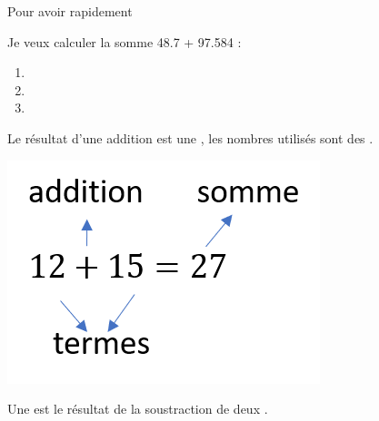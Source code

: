 {	\begin{mymeth}
		Pour avoir rapidement \hrulefill
		
		\vspace*{0.2cm}
		\hrulefill
		
		\vspace*{0.2cm}
		\hrulefill
	\end{mymeth}
	
	\begin{myex}
		Je veux calculer la somme \num{48.7} + \num{97.584} : 
		\begin{enumerate}
			\item \hrulefill 
			\item \hrulefill %
			\item \hrulefill %
		\end{enumerate}
	\end{myex}
}{%
	\begin{mydef}
	
		Le résultat d'une addition est une , les nombres utilisés sont des \kw{termes}.
	\end{mydef}

	\begin{myex}
		\begin{center}
			\includegraphics*[scale=0.7]{img/somme}
		\end{center}
	\end{myex}
		
	\begin{mydef}
			Une  est le résultat de la soustraction de deux .
		
	\end{mydef}

}
